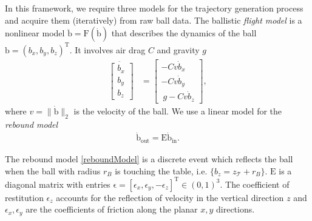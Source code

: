 \documentclass[letterpaper, 10 pt, conference]{ieeeconf}
\newcommand{\boldvec}[1]{\boldsymbol{\mathrm{#1}}}
\let\vec\boldvec
\newcommand{\ballFull}{\vec{x}_{B}} %
\newcommand{\ball}{\vec{b}} %
\newcommand{\ballRadius}{r_B}
\newcommand{\ballVel}{v}
\newcommand{\ballDynamics}{\vec{F}} %
\newcommand{\drag}{C} %
\newcommand{\gravity}{g}
\newcommand{\bounce}{\vec{E}}
\newcommand{\court}{\mathcal{T}} %
\begin{document}
In this framework, we require three models for the trajectory generation process and acquire them (iteratively) from raw ball data. The ballistic \emph{flight model} is a nonlinear model $\ddot{\ball} = \ballDynamics(\dot{\ball})$ that describes the dynamics of the ball $\ball = (b_x,b_y,b_z)^{\mathrm{T}}$. It involves air drag $\drag$ and gravity $\gravity$
%
\begin{align}
\ddot{\begin{bmatrix}
   b_x \\
   b_y \\
   b_z   
 \end{bmatrix}} &= 
 \begin{bmatrix}
 -\drag \ballVel \dot{b}_x  \\
 -\drag \ballVel \dot{b}_y  \\
 \ \gravity - \drag \ballVel \dot{b}_z 
 \end{bmatrix},
\label{flightModel}
\end{align}
%
\noindent where $\ballVel = \|\dot{\ball}\|_2$ is the velocity of the ball. We use a linear model for the \emph{rebound model}
%
\begin{align}
\dot{\ball}_{\mathrm{out}} = \bounce\dot{\ball}_{\mathrm{in}}.
\label{reboundModel}
\end{align}

\noindent The rebound model \eqref{reboundModel} is a discrete event which reflects the ball when the ball with radius $\ballRadius$ is touching the table, i.e. $\{b_z = z_{\court} + \ballRadius\}$. $\bounce$ is a diagonal matrix with entries $\vec{\epsilon} = [\epsilon_{x}, \epsilon_{y}, -\epsilon_{z}]^{\mathrm{T}} \in (0,1)^{3}$. The coefficient of restitution $\epsilon_{z}$ accounts for the reflection of velocity in the vertical direction $z$ and $\epsilon_{x}, \epsilon_{y}$ are the coefficients of friction along the planar $x,y$ directions.

\end{document}
